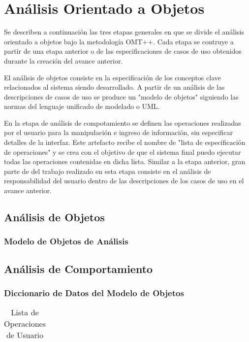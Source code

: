 \section{Análisis Orientado a Objetos}
Se describen a continuación las tres etapas generales en que se divide el análisis orientado a objetos bajo la metodología OMT++. Cada etapa se contruye a partir de una etapa anterior o de las especificaciones de casos de uso obtenidos durante la creación del avance anterior.

El análisis de objetos consiste en la especificación de los conceptos clave relacionados al sistema siendo desarrollado. A partir de un análisis de las descripciones de casos de uso se produce un "modelo de objetos" siguiendo las normas del lenguaje unificado de modelado o UML.

En la etapa de análisis de compotamiento se definen las operaciones realizadas por el usuario para la manipulación e ingreso de información, sin especificar detalles de la interfaz. Este artefacto recibe el nombre de "lista de especificación de operaciones" y se crea con el objetivo de que el sistema final puedo ejecutar todas las operaciones contenidas en dicha lista. Similar a la etapa anterior, gran parte de del trabajo realizado en esta etapa consiste en el análisis de responsabilidad del usuario dentro de las descripciones de los casos de uso en el avance anterior.

\subsection{Análisis de Objetos}

\subsubsection{Modelo de Objetos de Análisis}

\subsection{Análisis de Comportamiento}
\subsubsection{Diccionario de Datos del Modelo de Objetos}
\begin{table}[H]
    \centering
    \caption{Lista de Operaciones de Usuario}
    \vspace{10pt}
    \begin{tabular}{}
        \hline
	
        \hline
    \end{tabular}
    
    \label{table:1}
\end{table}


